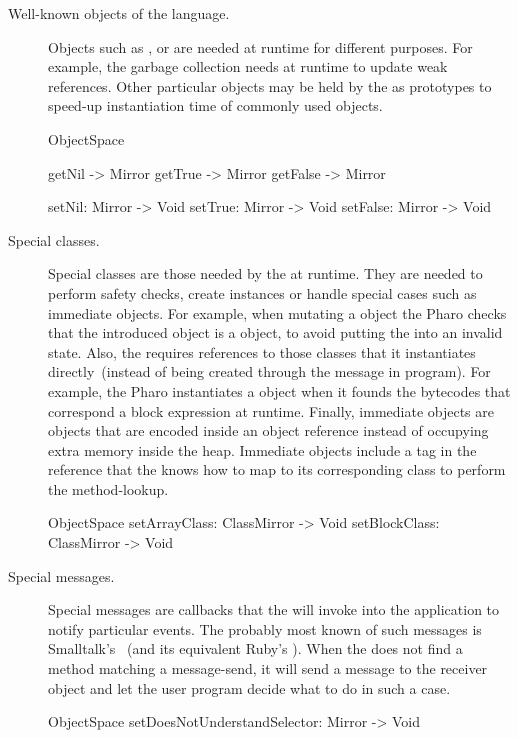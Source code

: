 \begin{description}
\item[Well-known objects of the language.] Objects such as ,  or  are needed at runtime for different purposes. For example, the garbage collection needs  at runtime to update weak references. Other particular objects may be held by the \VM as prototypes to speed-up instantiation time of commonly used objects.


\begin{code}
ObjectSpace {
    getNil -> Mirror
    getTrue -> Mirror
    getFalse -> Mirror

    setNil: Mirror -> Void
    setTrue: Mirror -> Void
    setFalse: Mirror -> Void
}
\end{code}

\item[Special classes.] Special classes are those needed by the \VM at runtime. They are needed to perform safety checks, create instances or handle special cases such as immediate objects. For example, when mutating a  object the Pharo \VM checks that the introduced object is a  object, to avoid putting the  into an invalid state. Also, the \VM requires references to those classes that it instantiates directly~(instead of being created through the  message in program). For example, the Pharo \VM instantiates a  object when it founds the bytecodes that correspond a block expression at runtime. Finally, immediate objects are objects that are encoded inside an object reference instead of occupying extra memory inside the heap. Immediate objects include a tag in the reference that the \VM knows how to map to its corresponding class to perform the method-lookup. 

\begin{code}
ObjectSpace {
    setArrayClass: ClassMirror -> Void
    setBlockClass: ClassMirror -> Void
}
\end{code}

\item[Special messages.] Special messages are callbacks that the \VM will invoke into the application to notify particular events. The probably most known of such messages is Smalltalk's ~(and its equivalent Ruby's ). When the \VM does not find a method matching a message-send, it will send a  message to the receiver object and let the user program decide what to do in such a case.

\begin{code}
ObjectSpace {
    setDoesNotUnderstandSelector: Mirror -> Void
}
\end{code}

\end{description}


